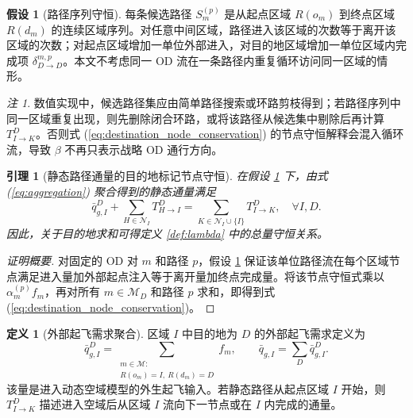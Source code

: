 \documentclass[a4paper,12pt]{article}
\theoremstyle{plain}
\newtheorem{lemma}[theorem]{引理}
\theoremstyle{definition}
\newtheorem{definition}[theorem]{定义}
\newtheorem{assumption}[theorem]{假设}
\theoremstyle{remark}
\newtheorem{remark}[theorem]{注}
\begin{document}
\begin{assumption}[路径序列守恒]\label{asm:path_sequence_conservation}
每条候选路径 $S_m^{(p)}$ 是从起点区域 $R(o_m)$ 到终点区域 $R(d_m)$ 的连续区域序列。对任意中间区域，路径进入该区域的次数等于离开该区域的次数；对起点区域增加一单位外部进入，对目的地区域增加一单位区域内完成项 $\delta_{D\to D}^{m,p}$。本文不考虑同一 OD 流在一条路径内重复循环访问同一区域的情形。
\end{assumption}

\begin{remark}
数值实现中，候选路径集应由简单路径搜索或环路剪枝得到；若路径序列中同一区域重复出现，则先删除闭合环路，或将该路径从候选集中剔除后再计算 $T_{I\to K}^D$。否则式 (\ref{eq:destination_node_conservation}) 的节点守恒解释会混入循环流，导致 $\beta$ 不再只表示战略 OD 通行方向。
\end{remark}

\begin{lemma}[静态路径通量的目的地标记节点守恒]\label{lem:path_flux_conservation}
在假设 \ref{asm:path_sequence_conservation} 下，由式 (\ref{eq:aggregation}) 聚合得到的静态通量满足
\begin{equation}\label{eq:destination_node_conservation}
    \bar q_{g,I}^D+\sum_{H\in\mathcal N_I}T_{H\to I}^D
    =
    \sum_{K\in\mathcal N_I\cup\{I\}}T_{I\to K}^D,
    \quad \forall I,D .
\end{equation}
因此，关于目的地求和可得定义 \ref{def:lambda} 中的总量守恒关系。
\end{lemma}

\begin{proof}[证明概要]
对固定的 OD 对 $m$ 和路径 $p$，假设 \ref{asm:path_sequence_conservation} 保证该单位路径流在每个区域节点满足进入量加外部起点注入等于离开量加终点完成量。将该节点守恒式乘以 $\alpha_m^{(p)}f_m$，再对所有 $m\in\mathcal M_D$ 和路径 $p$ 求和，即得到式 (\ref{eq:destination_node_conservation})。
\end{proof}

\begin{definition}[外部起飞需求聚合]\label{def:external_departure}
区域 $I$ 中目的地为 $D$ 的外部起飞需求定义为
\begin{equation}\label{eq:external_departure}
    \bar q_{g,I}^D =
    \sum_{\substack{m\in\mathcal M:\\ R(o_m)=I,\ R(d_m)=D}} f_m,
    \qquad
    \bar q_{g,I}=\sum_D \bar q_{g,I}^D .
\end{equation}
该量是进入动态空域模型的外生起飞输入。若静态路径从起点区域 $I$ 开始，则 $T_{I\to K}^D$ 描述进入空域后从区域 $I$ 流向下一节点或在 $I$ 内完成的通量。
\end{definition}
\end{document}
